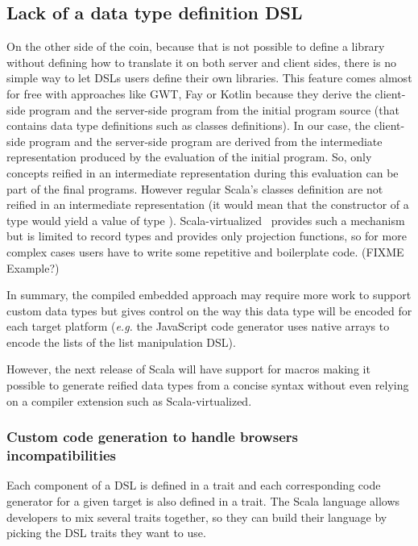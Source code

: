 \documentclass[american,english,runningheads]{llncs}
\newcommand{\eg}{\emph{e.g.}}
\begin{document}
\subsection{Lack of a data type definition DSL}

On the other side of the coin, because that is not possible to define a library without defining how to translate it
on both server and client sides, there is no simple way to let DSLs users define their own libraries. This feature
comes almost for free with approaches like GWT, Fay or Kotlin because they derive the client-side program and the
server-side program from the initial program source (that contains data type definitions such as classes
definitions). In our case, the client-side program and the server-side program are derived from the intermediate
representation produced by the evaluation of the initial program. So, only concepts reified in an intermediate
representation during this evaluation can be part of the final programs. However regular Scala’s classes definition
are not reified in an intermediate representation (it would mean that the constructor of a type  would yield
a value of type ). Scala-virtualized~\cite{Moors12_Virtualized} provides such a mechanism but is 
limited to record types and provides only projection functions, so for more complex cases users have to write some
repetitive and boilerplate code. (FIXME Example?)

In summary, the compiled embedded approach may require more work to support custom data types but gives control on
the way this data type will be encoded for each target platform (\eg{} the JavaScript code generator uses native
arrays to encode the lists of the list manipulation DSL).

However, the next release of Scala will have support for macros making it possible to generate reified data types
from a concise syntax without even relying on a compiler extension such as Scala-virtualized.

\subsubsection{Custom code generation to handle browsers incompatibilities}

Each component of a DSL is defined in a trait and each corresponding code generator for a given target is also
defined in a trait. The Scala language allows developers to mix several traits together, so they can build their
language by picking the DSL traits they want to use.
\end{document}
